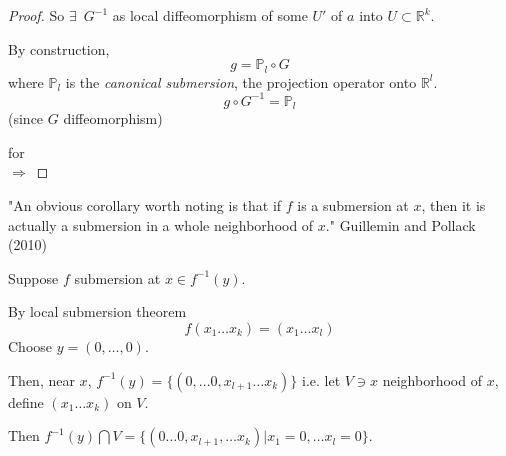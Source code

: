 \documentclass[10pt]{amsart}
\begin{document}
\begin{multicols*}{2}
\begin{proof}
So $\exists \, $ $G^{-1}$ as local diffeomorphism of some $U'$ of $a$ into $U\subset \mathbb{R}^k$.  

By construction, 
\begin{equation}
g=\mathbb{P}_l \circ G
\end{equation}
where $\mathbb{P}_l$ is the \emph{canonical submersion}, the projection operator onto $\mathbb{R}^l$.  
\[
g\circ G^{-1} = \mathbb{P}_l
\]
(since $G$ diffeomorphism)

for \\
$\Longrightarrow $ 


	\end{proof}
"An obvious corollary worth noting is that if $f$ is a submersion at $x$, then it is actually a submersion in a whole neighborhood of $x$." Guillemin and Pollack (2010) \cite{VGuilleminAPollack2010}

Suppose $f$ submersion at $x\in f^{-1}(y)$.  

By local submersion theorem
\[
f(x_1\dots x_k)=(x_1 \dots x_l)
\]
Choose $y=(0, \dots , 0)$. 

Then, near $x$, $f^{-1}(y) = \lbrace (0, \dots 0 , x_{l+1} \dots x_k)\rbrace$ i.e. let $V\ni x$ neighborhood of $x$, define $(x_1 \dots x_k)$ on $V$.  

Then $f^{-1}(y) \bigcap V = \lbrace (0\dots 0 , x_{l+1} , \dots x_k) | x_1 = 0 , \dots x_l = 0\rbrace$.


\end{multicols*}
\end{document}
